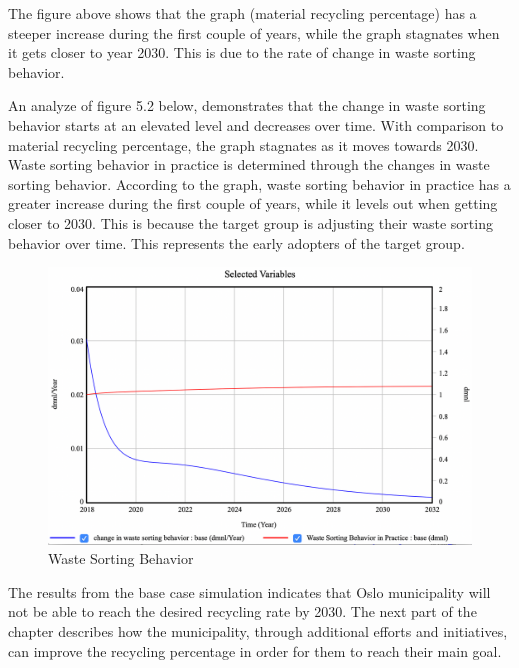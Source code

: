 \indent \newline
The figure above shows that the graph (material recycling percentage) has a steeper increase during the first couple of years, while the graph stagnates when it gets closer to year 2030. This is due to the rate of change in waste sorting behavior. 

\indent \newline
An analyze of figure 5.2 below, demonstrates that the change in waste sorting behavior starts at an elevated level and decreases over time. With comparison to material recycling percentage, the graph stagnates as it moves towards 2030. Waste sorting behavior in practice is determined through the changes in waste sorting behavior. According to the graph, waste sorting behavior in practice has a greater increase during the first couple of years, while it levels out when getting closer to 2030. This is because the target group is adjusting their waste sorting behavior over time. This represents the early adopters of the target group. 

\begin{figure}[H]
\centering
\includegraphics [scale=0.28,angle=360]{figures/basecase2.png}
\caption{Waste Sorting Behavior}
\label{fig:basecase2}
\end{figure}

\indent \newline
The results from the base case simulation indicates that Oslo municipality will not be able to reach the desired recycling rate by 2030. The next part of the chapter describes how the municipality, through additional efforts and initiatives, can improve the recycling percentage in order for them to reach their main goal. 

